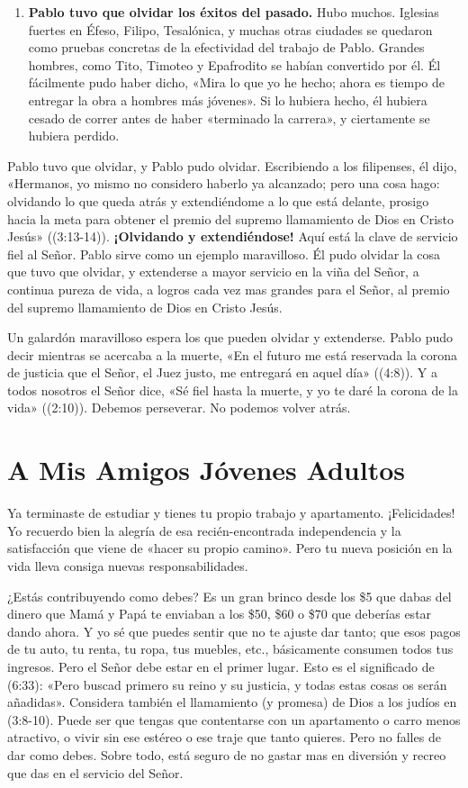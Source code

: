 \documentclass[12pt, twoside, openright]{book}
\begin{document}
\begin{enumerate}
\item \textbf{Pablo tuvo que olvidar los éxitos del pasado.} Hubo muchos. Iglesias fuertes en Éfeso, Filipo, Tesalónica, y muchas otras ciudades se quedaron como pruebas concretas de la efectividad del trabajo de Pablo. Grandes hombres, como Tito, Timoteo y Epafrodito se habían convertido por él. Él fácilmente pudo haber dicho, «Mira lo que yo he hecho; ahora es tiempo de entregar la obra a hombres más jóvenes». Si lo hubiera hecho, él hubiera cesado de correr antes de haber «terminado la carrera», y ciertamente se hubiera perdido. 
\end{enumerate}
Pablo tuvo que olvidar, y Pablo pudo olvidar. Escribiendo a los filipenses, él dijo, «Hermanos, yo mismo no considero haberlo ya alcanzado; pero una cosa hago: olvidando lo que queda atrás y extendiéndome a lo que está delante, prosigo hacia la meta para obtener el premio del supremo llamamiento de Dios en Cristo Jesús» ((3:13-14)). \textbf{¡Olvidando y extendiéndose!}  Aquí está la clave de servicio fiel al Señor. Pablo sirve como un ejemplo maravilloso. Él pudo olvidar la cosa que tuvo que olvidar, y extenderse a mayor servicio en la viña del Señor, a continua pureza de vida, a logros cada vez mas grandes para el Señor, al premio del supremo llamamiento de Dios en Cristo Jesús.

Un galardón maravilloso espera los que pueden olvidar y extenderse. Pablo pudo decir mientras se acercaba a la muerte, «En el futuro me está reservada la corona de justicia que el Señor, el Juez justo, me entregará en aquel día» ((4:8)). Y a todos nosotros el Señor dice, «Sé fiel hasta la muerte, y yo te daré la corona de la vida» ((2:10)). Debemos perseverar. No podemos volver atrás. 

\section{A Mis Amigos Jóvenes Adultos}
Ya terminaste de estudiar y tienes tu propio trabajo y apartamento. ¡Felicidades! Yo recuerdo bien la alegría de esa recién-encontrada independencia y la satisfacción que viene de «hacer su propio camino». Pero tu nueva posición en la vida lleva consiga nuevas responsabilidades. 

¿Estás contribuyendo como debes? Es un gran brinco desde los \$5 que dabas del dinero que Mamá y Papá te enviaban a los \$50, \$60 o \$70 que deberías estar dando ahora. Y yo sé que puedes sentir que no te ajuste dar tanto; que esos pagos de tu auto, tu renta, tu ropa, tus muebles, etc., básicamente consumen todos tus ingresos. Pero el Señor debe estar en el primer lugar. Esto es el significado de (6:33): «Pero buscad primero su reino y su justicia, y todas estas cosas os serán añadidas». Considera también el llamamiento (y promesa) de Dios a los judíos en (3:8-10). Puede ser que tengas que contentarse con un apartamento o carro menos atractivo, o vivir sin ese estéreo o ese traje que tanto quieres. Pero no falles de dar como debes. Sobre todo, está seguro de no gastar mas en diversión y recreo que das en el servicio del Señor.
\end{document}
